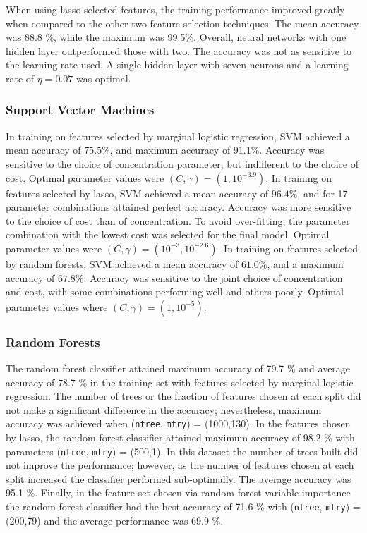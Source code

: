 \documentclass[a4paper]{article}
\begin{document}
When using lasso-selected features, the training performance improved greatly when compared to the other two feature selection techniques. The mean accuracy was 88.8 \%, while the maximum was 99.5\%. Overall, neural networks with one hidden layer outperformed those with two. The accuracy was not as sensitive to the learning rate used. A single hidden layer with seven neurons and a learning rate of $\eta = 0.07$ was optimal.

\subsubsection{Support Vector Machines}
In training on features selected by marginal logistic regression, SVM achieved a mean accuracy of $75.5\%$, and maximum accuracy of $91.1\%$. Accuracy was sensitive to the choice of concentration parameter, but indifferent to the choice of cost. Optimal parameter values were $(C,\gamma) = (1,10^{-3.9})$. In training on features selected by lasso, SVM achieved a mean accuracy of $96.4\%$, and for 17 parameter combinations attained perfect accuracy. Accuracy was more sensitive to the choice of cost than of concentration. To avoid over-fitting, the parameter combination with the lowest cost was selected for the final model. Optimal parameter values were $(C,\gamma) = (10^{-3},10^{-2.6})$. In training on features selected by random forests, SVM achieved a mean accuracy of $61.0\%$, and a maximum accuracy of $67.8\%$. Accuracy was sensitive to the joint choice of concentration and cost, with some combinations performing well and others poorly. Optimal parameter values where $(C,\gamma) = (1,10^{-5})$. 

\subsubsection{Random Forests}
The random forest classifier attained maximum accuracy of 79.7  \% and average accuracy of 78.7 \%  in the training set with features selected by marginal logistic regression. The number of trees or the fraction of features chosen at each split did not make a significant difference in the accuracy; nevertheless, maximum accuracy was achieved when (\texttt{ntree}, \texttt{mtry}) = (1000,130).  In the features chosen by lasso, the random forest classifier attained maximum accuracy of 98.2 \% with parameters   (\texttt{ntree}, \texttt{mtry}) = (500,1). In this dataset the number of trees built did not improve the performance; however, as the number of features chosen at each split increased the classifier performed sub-optimally. The average accuracy was 95.1 \%. Finally, in the feature set chosen via random forest variable importance the random forest classifier had the best accuracy of 71.6 \% with (\texttt{ntree}, \texttt{mtry}) = (200,79) and the average performance was 69.9 \%.
\end{document}
